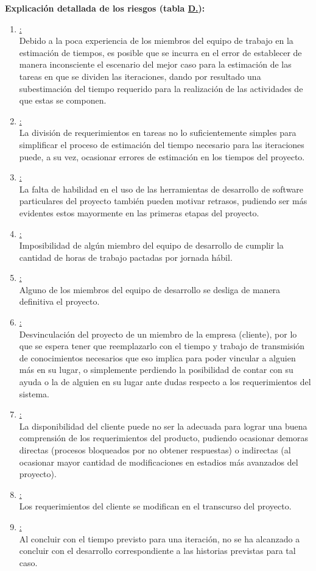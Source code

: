 \documentclass[a4paper, 12pt,twoside]{report}  %
\numberwithin{equation}{subsection} %
\begin{document}
\textbf{Explicación detallada de los riesgos (tabla \hyperref[tabla_riesgos]{D.\tempTblRiesgos}):}
\begin{enumerate}
	\item \underline{:}\\
	Debido a la poca experiencia de los miembros del equipo de trabajo en la estimación de tiempos, es posible que se incurra en el error de establecer de manera inconsciente el escenario del mejor caso para la estimación de las tareas en que se dividen las iteraciones, dando por resultado una subestimación del tiempo requerido para la realización de las actividades de que estas se componen.
	\item \underline{:}\\
	La división de requerimientos en tareas no lo suficientemente simples para simplificar el proceso de estimación del tiempo necesario para las iteraciones puede, a su vez, ocasionar errores de estimación en los tiempos del proyecto.
	\item \underline{:}\\
	La falta de habilidad en el uso de las herramientas de desarrollo de software particulares del proyecto también pueden motivar retrasos, pudiendo ser más evidentes estos mayormente en las primeras etapas del proyecto.
	\item \underline{:}\\
	Imposibilidad de algún miembro del equipo de desarrollo de cumplir la cantidad de horas de trabajo pactadas por jornada hábil.
	\item \underline{:}\\
	Alguno de los miembros del equipo de desarrollo se desliga de manera definitiva el proyecto.
	\item \underline{:}\\
	Desvinculación del proyecto de un miembro de la empresa (cliente), por lo que se espera tener que reemplazarlo con el tiempo y trabajo de transmisión de conocimientos necesarios que eso implica para poder vincular a alguien más en su lugar, o simplemente perdiendo la posibilidad de contar con su ayuda o la de alguien en su lugar ante dudas respecto a los requerimientos del sistema.
	\item \underline{:}\\
	La disponibilidad del cliente puede no ser la adecuada para lograr una buena comprensión de los requerimientos del producto, pudiendo ocasionar demoras directas (procesos bloqueados por no obtener respuestas) o indirectas (al ocasionar mayor cantidad de modificaciones en estadios más avanzados del proyecto).
	\item \underline{:}\\
	Los requerimientos del cliente se modifican en el transcurso del proyecto.
	\item \underline{:}\\
	Al concluir con el tiempo previsto para una iteración, no se ha alcanzado a concluir con el desarrollo correspondiente a las historias previstas para tal caso.
\end{enumerate}
\end{document}
